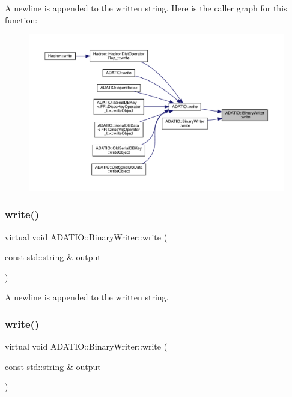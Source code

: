 A newline is appended to the written string. Here is the caller graph for this function\+:
\nopagebreak
\begin{figure}[H]
\begin{center}
\leavevmode
\includegraphics[width=350pt]{db/dee/classADATIO_1_1BinaryWriter_ac7731874e4949f80f0edbad2474c4b64_icgraph}
\end{center}
\end{figure}
\mbox{\label{classADATIO_1_1BinaryWriter_ac7731874e4949f80f0edbad2474c4b64}} 
\subsubsection{\texorpdfstring{write()}{write()}\hspace{0.1cm}{\footnotesize\ttfamily [2/36]}}
{\footnotesize\ttfamily virtual void A\+D\+A\+T\+I\+O\+::\+Binary\+Writer\+::write (\begin{DoxyParamCaption}\item[{const std\+::string \&}]{output }\end{DoxyParamCaption})\hspace{0.3cm}{\ttfamily [virtual]}}

A newline is appended to the written string. \mbox{\label{classADATIO_1_1BinaryWriter_ac7731874e4949f80f0edbad2474c4b64}} 
\subsubsection{\texorpdfstring{write()}{write()}\hspace{0.1cm}{\footnotesize\ttfamily [3/36]}}
{\footnotesize\ttfamily virtual void A\+D\+A\+T\+I\+O\+::\+Binary\+Writer\+::write (\begin{DoxyParamCaption}\item[{const std\+::string \&}]{output }\end{DoxyParamCaption})\hspace{0.3cm}{\ttfamily [virtual]}}


